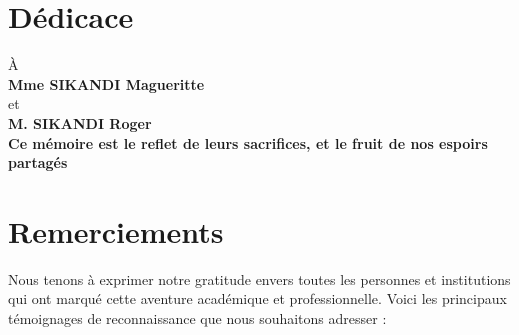 \documentclass[a4paper,12pt,openany]{report}
\begin{document}


{}
\chapter*{Dédicace}
\begin{center}
	À\\
	\textbf{Mme SIKANDI Magueritte} \\
	et \\
	\textbf{M. SIKANDI Roger}\\
	\textbf {Ce mémoire est le reflet de leurs sacrifices, et le fruit de nos espoirs partagés}
\end{center}

\newpage

   




 
	\chapter*{Remerciements}



Nous tenons à exprimer notre gratitude envers toutes les personnes et institutions qui ont marqué cette aventure académique et professionnelle. Voici les principaux témoignages de reconnaissance que nous souhaitons adresser :
\end{document}

